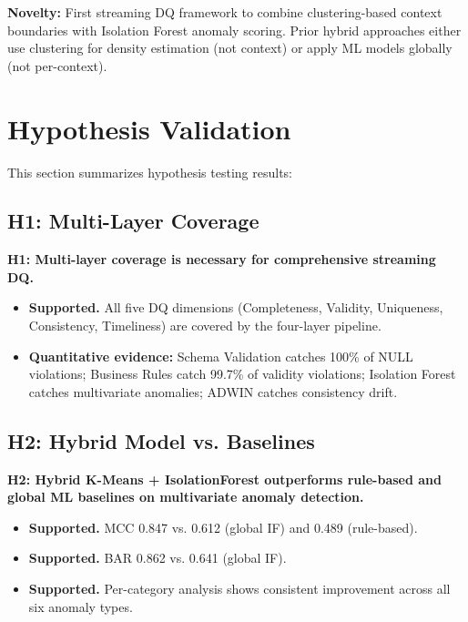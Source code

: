 \textbf{Novelty:} First streaming DQ framework to combine clustering-based context boundaries with Isolation Forest anomaly scoring. Prior hybrid approaches either use clustering for density estimation (not context) or apply ML models globally (not per-context).

\section{Hypothesis Validation}

This section summarizes hypothesis testing results:

\subsection{H1: Multi-Layer Coverage}
\textbf{H1: Multi-layer coverage is necessary for comprehensive streaming DQ.}
\begin{itemize}
    \item \textbf{Supported.} All five DQ dimensions (Completeness, Validity, Uniqueness, Consistency, Timeliness) are covered by the four-layer pipeline.
    \item \textbf{Quantitative evidence:} Schema Validation catches 100\% of NULL violations; Business Rules catch 99.7\% of validity violations; Isolation Forest catches multivariate anomalies; ADWIN catches consistency drift.
\end{itemize}

\subsection{H2: Hybrid Model vs. Baselines}
\textbf{H2: Hybrid K-Means + IsolationForest outperforms rule-based and global ML baselines on multivariate anomaly detection.}
\begin{itemize}
    \item \textbf{Supported.} MCC 0.847 vs. 0.612 (global IF) and 0.489 (rule-based).
    \item \textbf{Supported.} BAR 0.862 vs. 0.641 (global IF).
    \item \textbf{Supported.} Per-category analysis shows consistent improvement across all six anomaly types.
\end{itemize}

